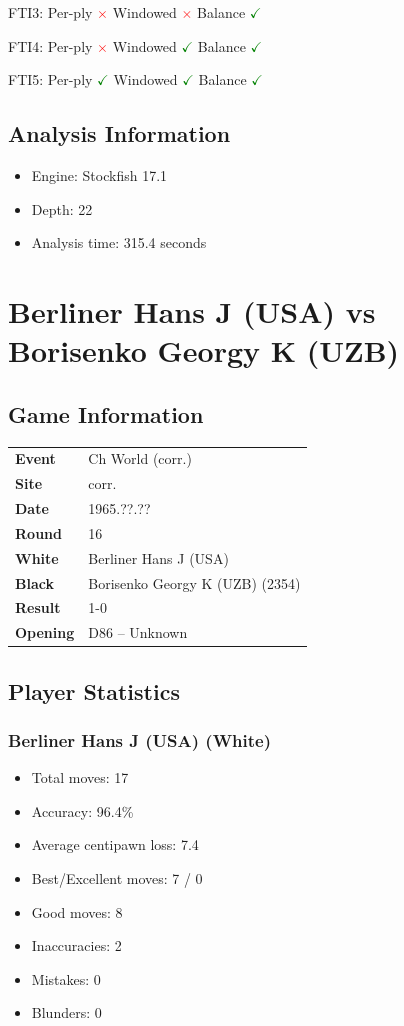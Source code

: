 \documentclass[11pt]{book}
\begin{document}
FTI3: Per-ply \textcolor{red}{$\times$} \quad Windowed \textcolor{red}{$\times$} \quad Balance \textcolor{green}{$\checkmark$}

FTI4: Per-ply \textcolor{red}{$\times$} \quad Windowed \textcolor{green}{$\checkmark$} \quad Balance \textcolor{green}{$\checkmark$}

FTI5: Per-ply \textcolor{green}{$\checkmark$} \quad Windowed \textcolor{green}{$\checkmark$} \quad Balance \textcolor{green}{$\checkmark$}

\section{Analysis Information}
\begin{itemize}
\item Engine: Stockfish 17.1
\item Depth: 22
\item Analysis time: 315.4 seconds
\end{itemize}

\chapter{Berliner Hans J (USA) vs Borisenko Georgy K (UZB)}

\section{Game Information}
\begin{tabular}{ll}
\textbf{Event} & Ch World (corr.) \\
\textbf{Site} & corr. \\
\textbf{Date} & 1965.??.?? \\
\textbf{Round} & 16 \\
\textbf{White} & Berliner Hans J (USA) \\
\textbf{Black} & Borisenko Georgy K (UZB) (2354) \\
\textbf{Result} & 1-0 \\
\textbf{Opening} & D86 -- Unknown \\
\end{tabular}

\section{Player Statistics}

\subsection{Berliner Hans J (USA) (White)}
\begin{itemize}
\item Total moves: 17
\item Accuracy: 96.4\%
\item Average centipawn loss: 7.4
\item Best/Excellent moves: 7 / 0
\item Good moves: 8
\item Inaccuracies: 2
\item Mistakes: 0
\item Blunders: 0
\end{itemize}
\end{document}
